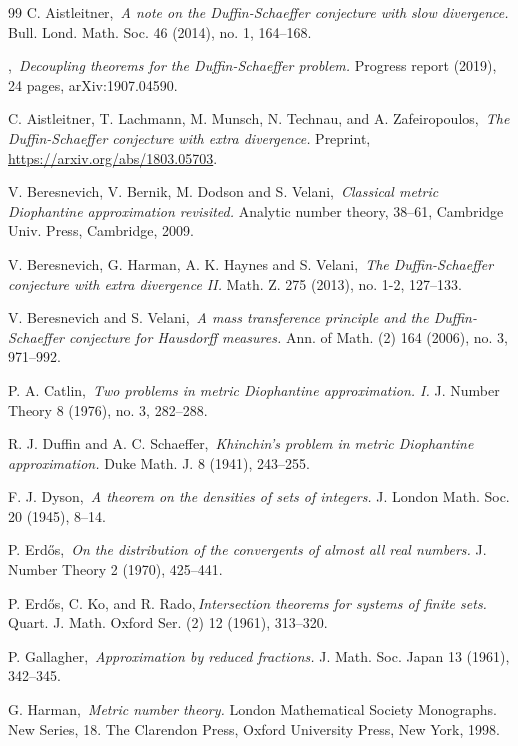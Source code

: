 \documentclass[12pt]{amsart}
\numberwithin{equation}{section}
\theoremstyle{definition}
\theoremstyle{remark}
\begin{document}
\begin{thebibliography}{99}
	C. Aistleitner,\,
	{\it A note on the Duffin-Schaeffer conjecture with slow divergence.}
	Bull. Lond. Math. Soc. 46 (2014), no. 1, 164--168. 
	
	\bysame,\,
	{\it Decoupling theorems for the Duffin-Schaeffer problem.} Progress report (2019), 24 pages,
	 arXiv:1907.04590.
	
	C. Aistleitner, T. Lachmann, M. Munsch, N. Technau, and A. Zafeiropoulos,\,
	{\it The Duffin-Schaeffer conjecture with extra divergence.}
	Preprint, \url{https://arxiv.org/abs/1803.05703}.
	
	V. Beresnevich, V. Bernik, M. Dodson and S. Velani,\,
	{\it Classical metric Diophantine approximation revisited.} 
	Analytic number theory, 38--61, Cambridge Univ. Press, Cambridge, 2009.
	
	V. Beresnevich, G. Harman, A. K. Haynes and S. Velani,\,
	{\it The Duffin-Schaeffer conjecture with extra divergence II.} 
	Math. Z. 275 (2013), no. 1-2, 127--133.
	
	V. Beresnevich and S. Velani,\,
	{\it A mass transference principle and the Duffin-Schaeffer conjecture for Hausdorff measures.}
	Ann. of Math. (2) 164 (2006), no. 3, 971--992. 
	
	P. A. Catlin,\,
	{\it Two problems in metric Diophantine approximation. I.}
	J. Number Theory 8 (1976), no. 3, 282--288.
	
	R. J. Duffin and A. C. Schaeffer,\,  {\it Khinchin's problem in metric Diophantine approximation.} 
	Duke Math. J. 8 (1941), 243--255.
	
	F. J. Dyson,\, {\it A theorem on the densities of sets of integers.} 
	J. London Math. Soc. 20 (1945), 8--14.	
	
	P. Erd\H os,\,
	{\it On the distribution of the convergents of almost all real numbers.} 
	J. Number Theory 2 (1970), 425--441. 
	
	P. Erd\H{o}s, C. Ko, and R. Rado,\,{\it Intersection theorems for systems of finite sets.}
	Quart. J. Math. Oxford Ser. (2) 12 (1961), 313--320.	
	
	P. Gallagher,\, 
	{\it Approximation by reduced fractions.} 
	J. Math. Soc. Japan 13 (1961), 342--345. 

	G. Harman,\,
	{\it Metric number theory.}
	London Mathematical Society Monographs. New Series, 18. The Clarendon Press, Oxford University Press, New York, 1998. 
	

\end{thebibliography}
\end{document}
